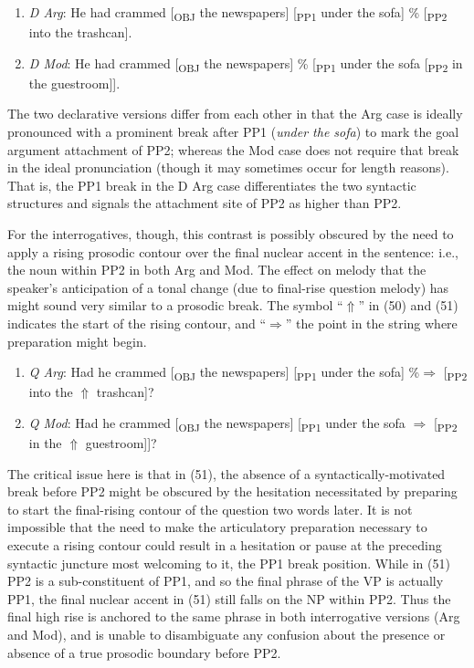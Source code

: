 \documentclass[11pt,oneside]{book}
\providecommand{\tightlist}{%
  \setlength{\itemsep}{0pt}\setlength{\parskip}{0pt}}
\begin{document}
\begin{enumerate}
\def\labelenumi{(\arabic{enumi})}
\setcounter{enumi}{47}
\tightlist
\item
  \emph{D Arg}: He had crammed {[}\textsubscript{OBJ} the newspapers{]} {[}\textsubscript{PP1} under the sofa{]} \% {[}\textsubscript{PP2} into the trashcan{]}.
\item
  \emph{D Mod}: He had crammed {[}\textsubscript{OBJ} the newspapers{]} \% {[}\textsubscript{PP1} under the sofa {[}\textsubscript{PP2} in the guestroom{]}{]}.
\end{enumerate}

The two declarative versions differ from each other in that the Arg case is ideally pronounced with a prominent break after PP1 (\emph{under the sofa}) to mark the goal argument attachment of PP2; whereas the Mod case does not require that break in the ideal pronunciation (though it may sometimes occur for length reasons). That is, the PP1 break in the D Arg case differentiates the two syntactic structures and signals the attachment site of PP2 as higher than PP2.

For the interrogatives, though, this contrast is possibly obscured by the need to apply a rising prosodic contour over the final nuclear accent in the sentence: i.e., the noun within PP2 in both Arg and Mod. The effect on melody that the speaker's anticipation of a tonal change (due to final-rise question melody) has might sound very similar to a prosodic break. The symbol ``\(\Uparrow\)'' in (50) and (51) indicates the start of the rising contour, and ``\(\Rightarrow\)'' the point in the string where preparation might begin.

\begin{enumerate}
\def\labelenumi{(\arabic{enumi})}
\setcounter{enumi}{49}
\tightlist
\item
  \emph{Q Arg}: Had he crammed {[}\textsubscript{OBJ} the newspapers{]} {[}\textsubscript{PP1} under the sofa{]} \%\(\Rightarrow\) {[}\textsubscript{PP2} into the \(\Uparrow\) trashcan{]}?
\item
  \emph{Q Mod}: Had he crammed {[}\textsubscript{OBJ} the newspapers{]} {[}\textsubscript{PP1} under the sofa \(\Rightarrow\) {[}\textsubscript{PP2} in the \(\Uparrow\) guestroom{]}{]}?
\end{enumerate}

The critical issue here is that in (51), the absence of a syntactically-motivated break before PP2 might be obscured by the hesitation necessitated by preparing to start the final-rising contour of the question two words later. It is not impossible that the need to make the articulatory preparation necessary to execute a rising contour could result in a hesitation or pause at the preceding syntactic juncture most welcoming to it, the PP1 break position. While in (51) PP2 is a sub-constituent of PP1, and so the final phrase of the VP is actually PP1, the final nuclear accent in (51) still falls on the NP within PP2. Thus the final high rise is anchored to the same phrase in both interrogative versions (Arg and Mod), and is unable to disambiguate any confusion about the presence or absence of a true prosodic boundary before PP2.
\end{document}
